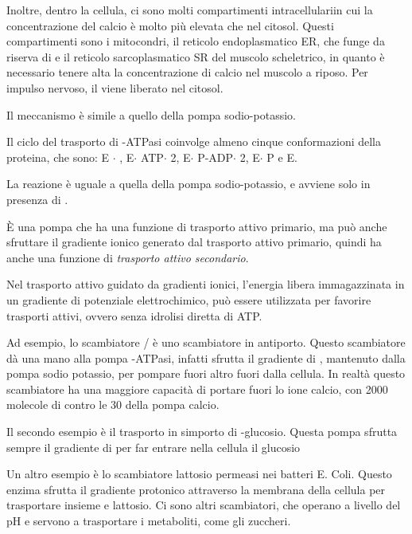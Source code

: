 Inoltre, dentro la cellula, ci sono molti compartimenti intracellulariin cui la concentrazione del calcio è molto più elevata che nel citosol. Questi compartimenti sono i mitocondri, il reticolo endoplasmatico ER, che funge da riserva di  e il reticolo sarcoplasmatico SR del muscolo scheletrico, in quanto è necessario tenere alta la concentrazione di calcio nel muscolo a riposo. Per impulso nervoso, il  viene liberato nel citosol.

Il meccanismo è simile a quello della pompa sodio-potassio.


Il ciclo del trasporto di -ATPasi coinvolge almeno cinque conformazioni della proteina, che sono: E $\cdot$ , E$\cdot$ ATP$\cdot$ 2, E$\cdot$ P-ADP$\cdot$ 2, E$\cdot$ P e E.

La reazione è uguale a quella della pompa sodio-potassio, e avviene solo in presenza di .

È una pompa che ha una funzione di trasporto attivo primario, ma può anche sfruttare il gradiente ionico generato dal trasporto attivo primario, quindi ha anche una funzione di \emph{trasporto attivo secondario}.

Nel trasporto attivo guidato da gradienti ionici, l'energia libera immagazzinata in un gradiente di potenziale elettrochimico, può essere utilizzata per favorire trasporti attivi, ovvero senza idrolisi diretta di ATP.

Ad esempio, lo scambiatore / è uno scambiatore in antiporto. Questo scambiatore dà una mano alla pompa -ATPasi, infatti sfrutta il gradiente di , mantenuto dalla pompa sodio potassio, per pompare fuori altro  fuori dalla cellula. In realtà questo scambiatore ha una maggiore capacità di portare fuori lo ione calcio, con 2000 molecole di  contro le 30 della pompa calcio.

Il secondo esempio è il trasporto in simporto di -glucosio. Questa pompa sfrutta sempre il gradiente di  per far entrare nella cellula il glucosio


Un altro esempio è lo scambiatore lattosio permeasi nei batteri E. Coli. Questo enzima sfrutta il gradiente protonico attraverso la membrana della cellula per trasportare insieme  e lattosio. Ci sono altri scambiatori, che operano a livello del pH e servono a trasportare i metaboliti, come gli zuccheri.





